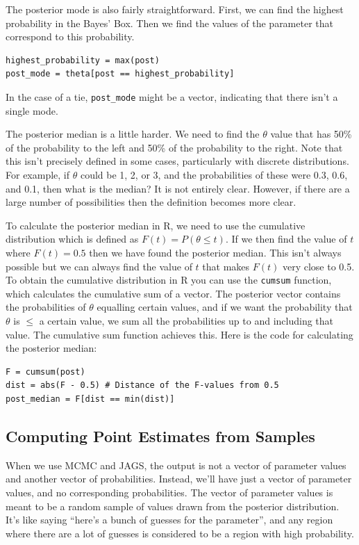 The posterior mode is also fairly straightforward. First, we can find the
highest probability in the Bayes' Box. Then we find the values of the parameter
that correspond to this probability.
\begin{framed}
\begin{verbatim}
highest_probability = max(post)
post_mode = theta[post == highest_probability]
\end{verbatim}
\end{framed}
In the case of a tie, {\tt post\_mode} might be a vector, indicating
that there isn't a single mode.


The posterior median is a little harder. We need to find the $\theta$ value
that has 50\% of the probability to the left and 50\% of the probability to the
right. Note that this isn't precisely defined in some cases, particularly with
discrete distributions. For example, if $\theta$ could be 1, 2, or 3, and the
probabilities of these were 0.3, 0.6, and 0.1, then what is the median? It is
not entirely clear. However, if there are a large number of possibilities then
the definition becomes more clear.

To calculate the posterior median in R, we need to use the cumulative distribution
which is defined as $F(t) = P(\theta \leq t)$. If we then find the value of $t$
where $F(t) = 0.5$ then we have found the posterior median. This isn't always
possible but we can always find the value of $t$ that makes $F(t)$ very close to
0.5.
To obtain the cumulative distribution
in R you can use the {\tt cumsum} function, which calculates the cumulative sum
of a vector. The posterior vector contains the probabilities of $\theta$ equalling
certain values, and if we want the probability that $\theta$ is $\leq$ a
certain value, we sum all the probabilities up to and including that value. The
cumulative sum function achieves this. Here is the code for calculating the
posterior median:
\begin{framed}
\begin{verbatim}
F = cumsum(post)
dist = abs(F - 0.5) # Distance of the F-values from 0.5
post_median = F[dist == min(dist)]
\end{verbatim}
\end{framed}


\subsection{Computing Point Estimates from Samples}
When we use MCMC and JAGS, the output is not a vector of parameter values and
another vector of probabilities. Instead, we'll have just a vector of parameter
values, and no corresponding probabilities. The vector of parameter values is
meant to be a random sample of values drawn from the posterior distribution.
It's like saying ``here's a bunch of guesses for the parameter'', and any
region where there are a lot of guesses is considered to be a region with high
probability.

